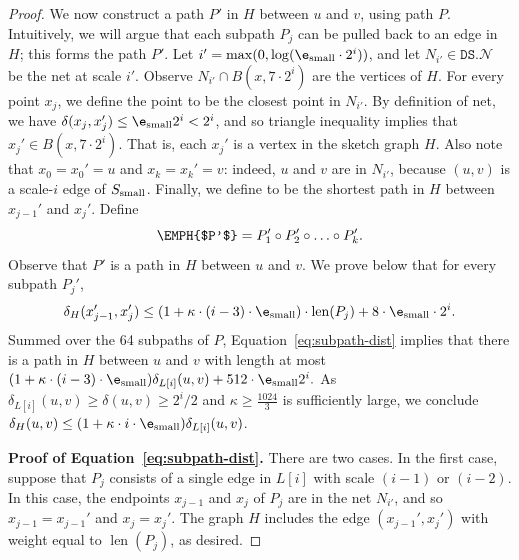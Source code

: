 \documentclass[11pt]{article}
\newcommand{\cN}{\mathcal{N}}
\newcommand{\dist}{\ensuremath{\delta}}
\newcommand{\DS}{\texttt{DS}}
\newcommand{\net}{{\ensuremath{\DS.\cN}}}
\newcommand{\len}{\ensuremath{\operatorname{len}}}
\begin{document}
\begin{proof}
We now construct a path $P'$ in $H$ between $u$ and $v$, using path $P$. Intuitively, we will argue that each subpath $P_j$ can be pulled back to an edge in $H$; this forms the path $P'$. Let $i' = \max(0, \log(\e_{\rm small}\cdot 2^i))$, and let $N_{i'} \in \net$ be the net at scale $i'$. Observe $N_{i'} \cap B(x, 7\cdot 2^i)$ are the vertices of $H$. For every point $x_j$, we define the point  to be the closest point in $N_{i'}$. By definition of net, we have $\dist(x_j,x_j') \le \e_{\rm small} 2^i < 2^i$, and so triangle inequality implies that $x_j' \in B(x, 7 \cdot 2^i)$. That is, each $x_j'$ is a vertex in the sketch graph $H$. Also note that $x_0 = x_0' = u$ and $x_k = x_k' = v$: indeed, $u$ and $v$ are in $N_{i'}$, because $(u,v)$ is a scale-$i$ edge of $S_{\rm small}$.  Finally, we define  to be the shortest path in $H$ between $x_{j-1}'$ and $x_j'$. Define
\[\EMPH{$P'$} = P_1' \circ P_2' \circ \ldots \circ P_k'.\]
Observe that $P'$ is a path in $H$ between $u$ and $v$. We prove below that for every subpath $P_j'$,
\begin{equation}
\label{eq:subpath-dist}
    \dist_H(x_{j-1}',x_j') \le (1+\kappa\cdot(i-3)\cdot\e_{\rm small})\cdot \len(P_j) + 8 \cdot \e_{\rm small} \cdot 2^i.
\end{equation}
Summed over the 64 subpaths of $P$, Equation~\ref{eq:subpath-dist} implies that there is a path in $H$ between $u$ and $v$ with length at most 
\((1+\kappa \cdot (i-3) \cdot \e_{\rm small})\dist_{L[i]}(u,v) + 512 \cdot \e_{\rm small} 2^i.\)
As $\dist_{L[i]}(u,v) \ge \dist(u,v) \ge 2^i/2$ and $\kappa \ge \frac {1024} 3$ is sufficiently large, we conclude \(\dist_H(u,v) \le (1+\kappa \cdot i \cdot \e_{\rm small}) \dist_{L[i]}(u,v)\).

\medskip \noindent \textbf{Proof of Equation~\ref{eq:subpath-dist}.} There are two cases. In the first case, suppose that $P_j$ consists of a single edge in $L[i]$ with scale $(i-1)$ or $(i-2).$ In this case, the endpoints $x_{j-1}$ and $x_j$ of $P_j$ are in the net $N_{i'}$, and so $x_{j-1} = x_{j-1}'$ and $x_{j} = x_{j}'$. 
The graph $H$ includes the edge $(x_{j-1}',x_j')$ with weight equal to $\len(P_j)$, as desired.


\end{proof}
\end{document}
